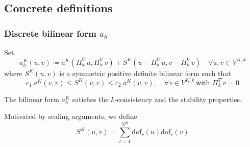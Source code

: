 \documentclass[10pt]{beamer}
\newcommand{\dof}{\text{dof}}
\begin{document}
	\subsection{Concrete definitions}

\begin{frame} \frametitle{Discrete bilinear form $a_h$}
Set
	\begin{equation*}
	a_h^K(u,v) \coloneqq a^K(\Pi_k^\nabla u, \Pi_k^\nabla v)+S^K(u-\Pi_k^\nabla u, v-\Pi_k^\nabla v) \quad \forall u,v \in V^{K,k}
	\label{eqn:ah}
	\end{equation*}	
	where $S^K(u,v)$ is a symmetric positive definite bilinear form such that
	\begin{equation*}
	c_1 \ a^K(v,v) \leq S^K(v,v) \leq c_2 \ a^K(v,v), \quad \forall v \in V^{K,k} \, \text{with } \Pi_k^\nabla v =0
	\label{eqn:Sk}
	\end{equation*}
	
	\begin{theorem}
		The bilinear form $a_h^K$ satisfies the $k$-consistency and the stability properties.
	\end{theorem}
Motivated by scaling arguments, we define
\begin{equation*}
S^K(u,v)=\sum_{r=1}^{N^K} \dof_r(u) \dof_r(v)
\end{equation*}
\end{frame}	
	

\end{document}

